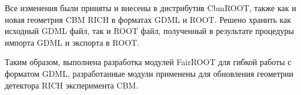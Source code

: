 Все изменения были приняты и внесены в дистрибутив CbmROOT, также как и новая геометрия CBM RICH в форматах GDML и ROOT. Решено хранить как исходный GDML файл, так и ROOT файл, полученный в результате процедуры импорта GDML и экспорта в ROOT.

Таким образом, выполнена разработка модулей FairROOT для гибкой работы с форматом GDML, разработанные модули применены для обновления геометрии детектора RICH эксперимента CBM.
